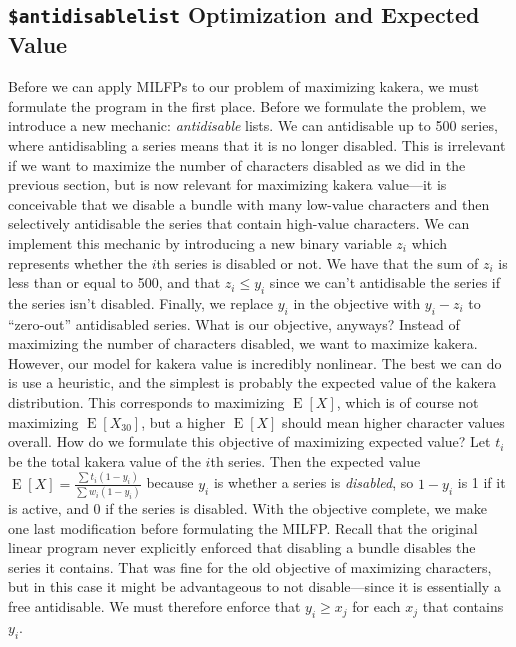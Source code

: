 \documentclass[11pt, oneside]{article}
\DeclareMathOperator{\E}{E}
\theoremstyle{plain}
\theoremstyle{definition}
\begin{document}
\subsection{\texttt{\$antidisablelist} Optimization and Expected Value}
Before we can apply MILFPs to our problem of maximizing kakera, we must
formulate the program in the first place. Before we formulate the problem,
we introduce a new mechanic: \textit{antidisable} lists. We can antidisable
up to 500 series, where antidisabling a series means that it is no longer
disabled. This is irrelevant if we want to maximize the number of characters
disabled as we did in the previous section, but is now relevant for maximizing
kakera value---it is conceivable that we disable a bundle with many low-value
characters and then selectively antidisable the series that contain high-value
characters. We can implement this mechanic by introducing a new binary variable
\( z_i \) which represents whether the \( i \)th series is disabled or not.
We have that the sum of \( z_i \) is less than or equal to 500, and that \(
z_i \leq y_i \) since we can't antidisable the series if the series isn't
disabled. Finally, we replace \( y_i \) in the objective with \( y_i - z_i \)
to \enquote{zero-out} antidisabled series. What is our objective, anyways?
Instead of maximizing the number of characters disabled, we want to maximize
kakera. However, our model for kakera value is incredibly nonlinear. The best
we can do is use a heuristic, and the simplest is probably the expected value
of the kakera distribution. This corresponds to maximizing \( \E[X] \), which
is of course not maximizing \( \E[X_{30}] \), but a higher \( \E[X] \) should
mean higher character values overall. How do we formulate this objective of
maximizing expected value? Let \( t_i \) be the total kakera value of the \( i
\)th series. Then the expected value \( \E[X] = \frac{\sum t_i (1 - y_i)}{\sum
w_i (1 - y_i)} \) because \( y_i \) is whether a series is \textit{disabled},
so \( 1 - y_i \) is 1 if it is active, and 0 if the series is disabled. With
the objective complete, we make one last modification before formulating the
MILFP. Recall that the original linear program never explicitly enforced that
disabling a bundle disables the series it contains. That was fine for the old
objective of maximizing characters, but in this case it might be advantageous
to not disable---since it is essentially a free antidisable. We must therefore
enforce that \( y_i \geq x_j \) for each \( x_j \) that contains \( y_i \).
\end{document}

